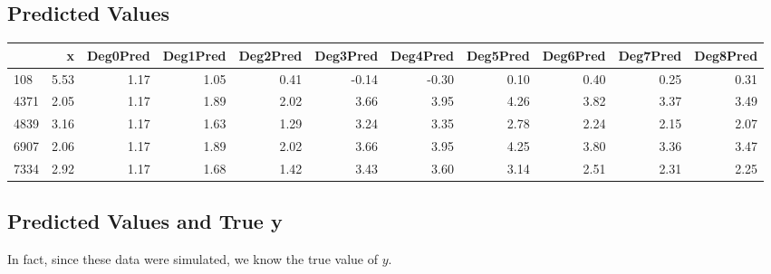 \documentclass[]{book}
\newenvironment{Shaded}{\begin{snugshade}}{\end{snugshade}}
\newcommand{\KeywordTok}[1]{\textcolor[rgb]{0.13,0.29,0.53}{\textbf{#1}}}
\newcommand{\DecValTok}[1]{\textcolor[rgb]{0.00,0.00,0.81}{#1}}
\newcommand{\StringTok}[1]{\textcolor[rgb]{0.31,0.60,0.02}{#1}}
\newcommand{\OperatorTok}[1]{\textcolor[rgb]{0.81,0.36,0.00}{\textbf{#1}}}
\newcommand{\NormalTok}[1]{#1}
\begin{document}
\subsection{Predicted Values}\label{predicted-values}

\begin{Shaded}
\end{Shaded}

\begin{tabular}{l|r|r|r|r|r|r|r|r|r|r}
\hline
  & x & Deg0Pred & Deg1Pred & Deg2Pred & Deg3Pred & Deg4Pred & Deg5Pred & Deg6Pred & Deg7Pred & Deg8Pred\\
\hline
108 & 5.53 & 1.17 & 1.05 & 0.41 & -0.14 & -0.30 & 0.10 & 0.40 & 0.25 & 0.31\\
\hline
4371 & 2.05 & 1.17 & 1.89 & 2.02 & 3.66 & 3.95 & 4.26 & 3.82 & 3.37 & 3.49\\
\hline
4839 & 3.16 & 1.17 & 1.63 & 1.29 & 3.24 & 3.35 & 2.78 & 2.24 & 2.15 & 2.07\\
\hline
6907 & 2.06 & 1.17 & 1.89 & 2.02 & 3.66 & 3.95 & 4.25 & 3.80 & 3.36 & 3.47\\
\hline
7334 & 2.92 & 1.17 & 1.68 & 1.42 & 3.43 & 3.60 & 3.14 & 2.51 & 2.31 & 2.25\\
\hline
\end{tabular}

\subsection{Predicted Values and True
y}\label{predicted-values-and-true-y}

In fact, since these data were simulated, we know the true value of
\(y\).

\begin{Shaded}
\end{Shaded}
\end{document}
